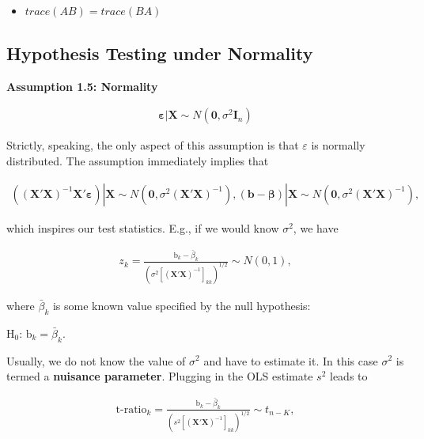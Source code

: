 \documentclass[]{book}
\providecommand{\tightlist}{%
  \setlength{\itemsep}{0pt}\setlength{\parskip}{0pt}}
\theoremstyle{definition}
\theoremstyle{definition}
\theoremstyle{definition}
\theoremstyle{remark}
\begin{document}
\begin{itemize}
\tightlist
\item
  \(trace(AB)=trace(BA)\)

\end{itemize}

\hypertarget{Testing}{%
\subsection{Hypothesis Testing under Normality}\label{Testing}}

\textbf{Assumption 1.5: Normality}

\[
\begin{align*}
  \boldsymbol{\varepsilon}|\mathbf{X}\sim N(\mathbf{0},\sigma^2 \mathbf{I}_n)
\end{align*}
\]

Strictly, speaking, the only aspect of this assumption is that \(\varepsilon\) is
normally distributed. The assumption immediately implies that

\[
\begin{align*}
  ((\mathbf{X}'\mathbf{X})^{-1}\mathbf{X}'\boldsymbol{\varepsilon})|\mathbf{X}\sim N(\mathbf{0},\sigma^2 (\mathbf{X}'\mathbf{X})^{-1}),
  (\mathbf{b}-\boldsymbol{\beta})|\mathbf{X}\sim N(\mathbf{0},\sigma^2 (\mathbf{X}'\mathbf{X})^{-1}),
\end{align*}
\]

which inspires our test statistics. E.g., if we would know \(\sigma^2\),
we have

\[
\begin{align*}
  z_k=\frac{\text{b}_k-\bar{\beta}_k}{\left(\sigma^2\left[(\mathbf{X}'\mathbf{X})^{-1}\right]_{kk}\right)^{1/2}}\sim N(0,1),
\end{align*}
\]

where \(\bar{\beta}_k\) is some known value specified by the null
hypothesis:

\(\text{H}_0\): \(\text{b}_k=\bar{\beta}_k\).

Usually, we do not know the value of \(\sigma^2\) and have to estimate it.
In this case \(\sigma^2\) is termed a \textbf{nuisance parameter}. Plugging in
the OLS estimate \(s^2\) leads to

\[
\begin{align*}
  \text{t-ratio}_k=\frac{\text{b}_k-\bar{\beta}_k}{\left(s^2\left[(\mathbf{X}'\mathbf{X})^{-1}\right]_{kk}\right)^{1/2}}\sim t_{n-K},
\end{align*}
\]
\end{document}
